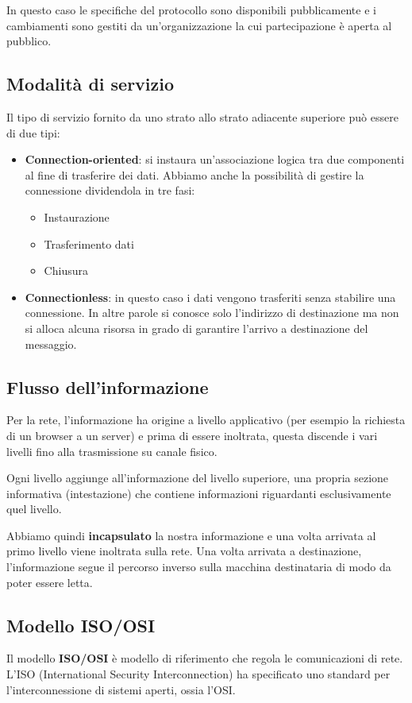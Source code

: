 In questo caso le specifiche del protocollo sono disponibili 
pubblicamente e i cambiamenti sono gestiti da un'organizzazione la cui 
partecipazione è aperta al pubblico.

\subsection{Modalità di servizio}
Il tipo di servizio fornito da uno strato allo strato adiacente 
superiore può essere di due tipi:
\begin{itemize}
	\item \textbf{Connection-oriented}: si instaura un'associazione 
		logica tra due componenti al fine di trasferire dei dati.
		Abbiamo anche la possibilità di gestire la connessione 
		dividendola in tre fasi:
		\begin{itemize}
			\item Instaurazione
			\item Trasferimento dati
			\item Chiusura
		\end{itemize}
	\item \textbf{Connectionless}: in questo caso i dati vengono 
		trasferiti senza stabilire una connessione. In altre parole
		si conosce solo l'indirizzo di destinazione ma non si alloca
		alcuna risorsa in grado di garantire l'arrivo a destinazione
		del messaggio.
\end{itemize}

\subsection{Flusso dell'informazione}
Per la rete, l'informazione ha origine a livello applicativo (per 
esempio la richiesta di un browser a un server) e prima di essere 
inoltrata, questa discende i vari livelli fino alla trasmissione su 
canale fisico.

Ogni livello aggiunge all'informazione del livello superiore, una 
propria sezione informativa (intestazione) che contiene informazioni 
riguardanti esclusivamente quel livello.

Abbiamo quindi \textbf{incapsulato} la nostra informazione e una volta 
arrivata al primo livello viene inoltrata sulla rete. Una volta 
arrivata a destinazione, l'informazione segue il percorso inverso sulla
macchina destinataria di modo da poter essere letta.

\subsection{Modello ISO/OSI}
Il modello \textbf{ISO/OSI} è modello di riferimento che regola le 
comunicazioni di rete. L'ISO (International Security Interconnection)
ha specificato uno standard per l'interconnessione di sistemi aperti, 
ossia l'OSI.

